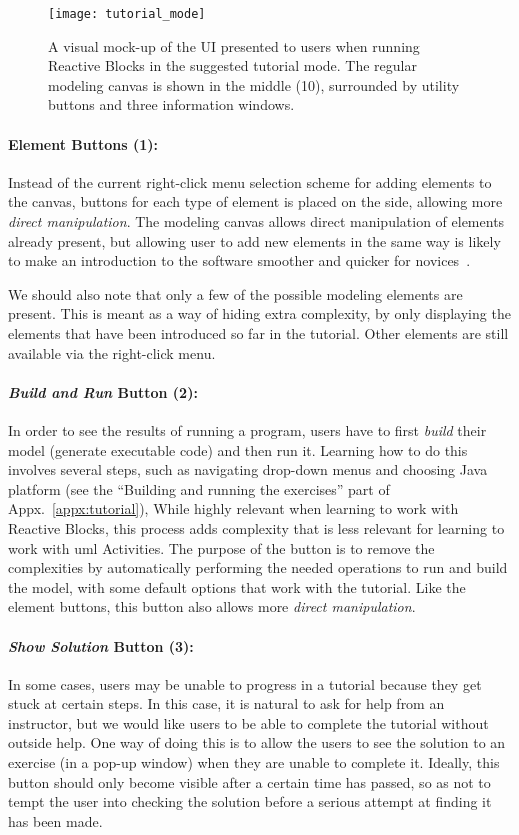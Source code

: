 \begin{figure}[htp]
	\centering
	\texttt{[image: tutorial\_mode]}
	\caption[Reactive Blocks Tutorial Mode Design]{A visual mock-up of the UI presented to users when running Reactive Blocks in the suggested tutorial mode. The regular modeling canvas is shown in the middle (10), surrounded by utility buttons and three information windows.}
	\label{fig:tutorial_mode}
\end{figure}

\paragraph{Element Buttons (1):} Instead of the current right-click menu selection scheme for adding elements to the canvas, buttons for each type of element is placed on the side, allowing more \emph{direct manipulation}. The modeling canvas allows direct manipulation of elements already present, but allowing user to add new elements in the same way is likely to make an introduction to the software smoother and quicker for novices~\cite{shneiderman:user_interface}.

\noindent
We should also note that only a few of the possible modeling elements are present. This is meant as a way of hiding extra complexity, by only displaying the elements that have been introduced so far in the tutorial. Other elements are still available via the right-click menu.

\paragraph{\emph{Build and Run} Button (2):} In order to see the results of running a program, users have to first \emph{build} their model (generate executable code) and then run it. Learning how to do this involves several steps, such as navigating drop-down menus and choosing Java platform (see the ``Building and running the exercises'' part of Appx.~\ref{appx:tutorial}), While highly relevant when learning to work with Reactive Blocks, this process adds complexity that is less relevant for learning to work with \gls{uml} Activities. The purpose of the button is to remove the complexities by automatically performing the needed operations to run and build the model, with some default options that work with the tutorial. Like the element buttons, this button also allows more \emph{direct manipulation}.

\paragraph{\emph{Show Solution} Button (3):} In some cases, users may be unable to progress in a tutorial because they get stuck at certain steps. In this case, it is natural to ask for help from an instructor, but we would like users to be able to complete the tutorial without outside help. One way of doing this is to allow the users to see the solution to an exercise (in a pop-up window) when they are unable to complete it. Ideally, this button should only become visible after a certain time has passed, so as not to tempt the user into checking the solution before a serious attempt at finding it has been made.

